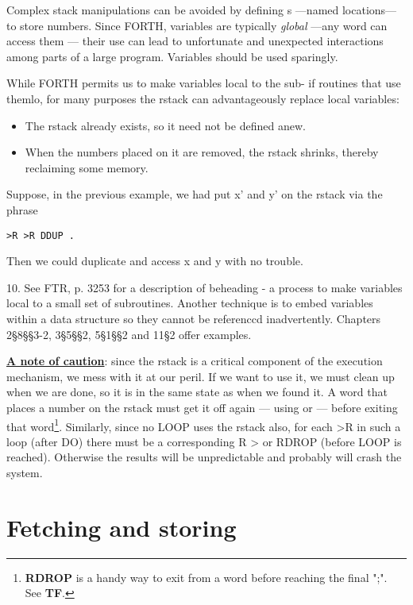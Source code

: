 Complex stack manipulations can be avoided by defining s —named locations— to store numbers. Since FORTH, variables are typically \textit{global} —any word can access them — their use can lead to unfortunate and unexpected interactions among parts of a large program. Variables should be used sparingly.

While FORTH permits us to make variables local to the sub- if routines that use themlo, for many purposes the rstack can advantageously replace local variables:

\begin{itemize}
    \item The rstack already exists, so it need not be defined anew.
    \item When the numbers placed on it are removed, the rstack shrinks, thereby reclaiming some memory.
\end{itemize}

Suppose, in the previous example, we had put x’ and y’ on the rstack via the phrase

\begin{lstlisting}
>R >R DDUP .
\end{lstlisting}

Then we could duplicate and access x and y with no trouble.

10. See FTR, p. 3253 for a description of beheading - a process to make variables local to a small set of subroutines. Another technique is to embed variables within a data structure so they cannot be referenccd inadvertently. Chapters 2§8§§3-2, 3§5§§2, 5§1§§2 and 11§2 offer examples.

\leftbar[1\linewidth]
\underline{\textbf{A note of caution}}: since the rstack is a critical component of the execution mechanism, we mess with it at our peril. If we want to use it, we must clean up when we are done, so it is in the same state as when we found it. A word that places a number on the rstack must get it off again — using  or  — before exiting that word\footnote{\textbf{RDROP} is a handy way to exit from a word before reaching the final ";". See \textbf{TF}.}. Similarly, since no LOOP uses the rstack also, for each >R in such a loop (after DO) there must be a corresponding R > or RDROP (before LOOP is reached). Otherwise the results will be unpredictable and probably will crash the system.
\endleftbar

\section{Fetching and storing}

